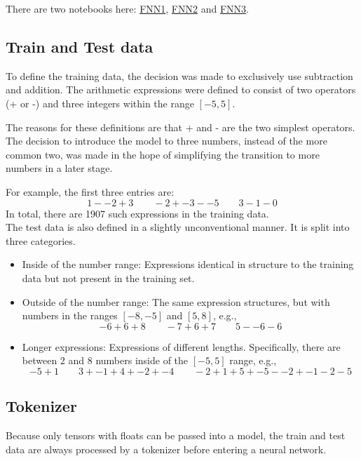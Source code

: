 \documentclass{article}
\begin{document}
There are two notebooks here: \href{https://github.com/AntonStantan/matura/blob/main/FNN/FNN1.ipynb}{FNN1}, \href{https://github.com/AntonStantan/matura/blob/main/FNN/FNN2.ipynb}{FNN2} and \href{https://github.com/AntonStantan/matura/blob/main/FNN/FNN3.ipynb}{FNN3}.

\subsection{Train and Test data}
To define the training data, the decision was made to exclusively use subtraction and addition. The arithmetic expressions were defined to consist of two operators (+ or -) and three integers within the range $[-5, 5]$.

The reasons for these definitions are that + and - are the two simplest operators. The decision to introduce the model to three numbers, instead of the more common two, was made in the hope of simplifying the transition to more numbers in a later stage.

For example, the first three entries are:
\[
1 - -2 + 3 \qquad -2 + -3 - -5 \qquad 3 - 1 - 0
\]
{\small In total, there are 1907 such expressions in the training data.}
\\[2em]
The test data is also defined in a slightly unconventional manner. It is split into three categories.
\begin{itemize}
    \item Inside of the number range: Expressions identical in structure to the training data but not present in the training set.
    \item Outside of the number range: The same expression structures, but with numbers in the ranges $[-8, -5]$ and $[5, 8]$, e.g.,
\[
-6 + 6 + 8 \qquad -7 + 6 + 7 \qquad 5 - -6 - 6
\]
    \item Longer expressions: Expressions of different lengths. Specifically, there are between 2 and 8 numbers inside of the $[-5, 5]$ range, e.g.,
\[
-5 + 1 \qquad 3 + -1 + 4 + -2 + -4 \qquad -2 + 1 + 5 + -5 - -2 + -1 - 2 - 5
\]
\end{itemize}

\subsection{Tokenizer}

Because only tensors with floats can be passed into a model, the train and test data are always processed by a tokenizer before entering a neural network.
\end{document}

